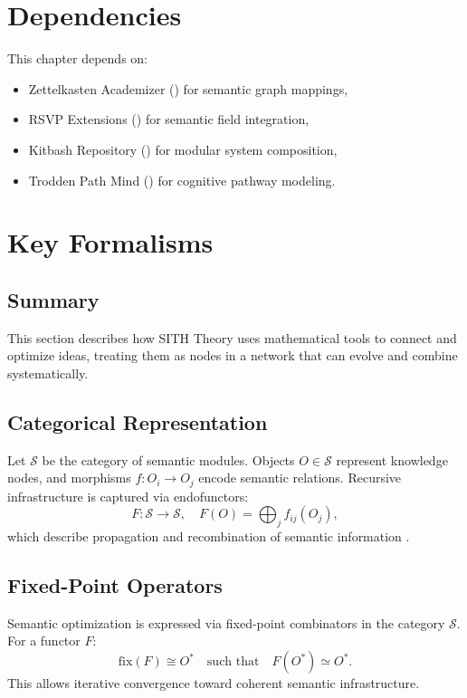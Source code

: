 \documentclass[11pt,oneside]{memoir}
\theoremstyle{plain}
\newcommand{\Sfun}{\mathcal{S}}
\begin{document}
\section{Dependencies}
This chapter depends on:
\begin{itemize}
    \item Zettelkasten Academizer () for semantic graph mappings,
    \item RSVP Extensions () for semantic field integration,
    \item Kitbash Repository () for modular system composition,
    \item Trodden Path Mind () for cognitive pathway modeling.
\end{itemize}

\section{Key Formalisms}
\subsection{Summary}
This section describes how SITH Theory uses mathematical tools to connect and optimize ideas, treating them as nodes in a network that can evolve and combine systematically.

\subsection{Categorical Representation}
Let \(\Sfun\) be the category of semantic modules. Objects \(O \in \Sfun\) represent knowledge nodes, and morphisms \(f: O_i \to O_j\) encode semantic relations. Recursive infrastructure is captured via endofunctors:
\begin{equation}
    F: \Sfun \to \Sfun, \quad F(O) = \bigoplus_{j} f_{ij}(O_j),
\end{equation}
which describe propagation and recombination of semantic information \cite{maclane}.

\subsection{Fixed-Point Operators}
Semantic optimization is expressed via fixed-point combinators in the category \(\Sfun\). For a functor \(F\):
\begin{equation}
    \text{fix}(F) \cong O^* \quad \text{such that} \quad F(O^*) \simeq O^*.
\end{equation}
This allows iterative convergence toward coherent semantic infrastructure.
\end{document}
